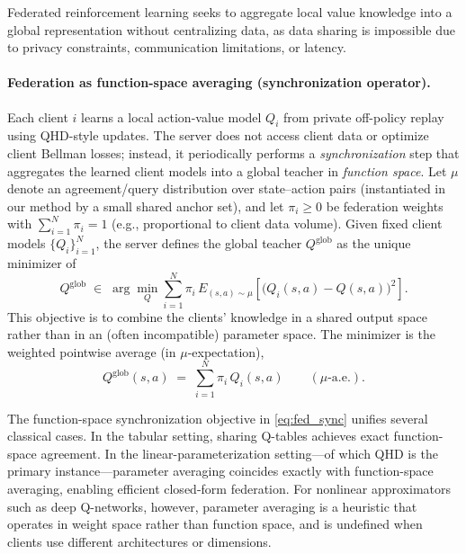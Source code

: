 Federated reinforcement learning seeks to aggregate local value knowledge into a global representation without centralizing data, as data sharing is impossible due to privacy constraints, communication limitations, or latency.




\paragraph{Federation as function-space averaging (synchronization operator).}
Each client $i$ learns a local action-value model $Q_i$ from private off-policy replay using QHD-style updates. The server does not access client data or optimize client Bellman losses; instead, it periodically performs a \emph{synchronization} step that aggregates the learned client models into a global teacher in \emph{function space}. Let $\mu$ denote an agreement/query distribution over state--action pairs (instantiated in our method by a small shared anchor set), and let $\pi_i\ge 0$ be federation weights with $\sum_{i=1}^N \pi_i=1$ (e.g., proportional to client data volume).
Given fixed client models $\{Q_i\}_{i=1}^N$, the server defines the global teacher $Q^{\mathrm{glob}}$ as the unique minimizer of
\begin{equation}
Q^{\mathrm{glob}} \;\in\; \arg\min_{Q} \sum_{i=1}^N \pi_i\, E_{(s,a)\sim\mu}\!\left[\big(Q_i(s,a)-Q(s,a)\big)^2\right].
\label{eq:fed_sync}
\end{equation}
This objective is to combine the clients' knowledge in a shared output space rather than in an (often incompatible) parameter space.  The minimizer is the weighted pointwise average (in $\mu$-expectation),
\begin{equation}
Q^{\mathrm{glob}}(s,a) \;=\; \sum_{i=1}^N \pi_i\,Q_i(s,a) \qquad (\mu\text{-a.e.}).
\label{eq:qglob_avg}
\end{equation}

The function-space synchronization objective in \eqref{eq:fed_sync} unifies several classical cases. In the tabular setting, sharing Q-tables achieves exact function-space agreement. In the linear-parameterization setting—of which QHD is the primary instance—parameter averaging coincides exactly with function-space averaging, enabling efficient closed-form federation. For nonlinear approximators such as deep Q-networks, however, parameter averaging is a heuristic that operates in weight space rather than function space, and is undefined when clients use different architectures or dimensions.



